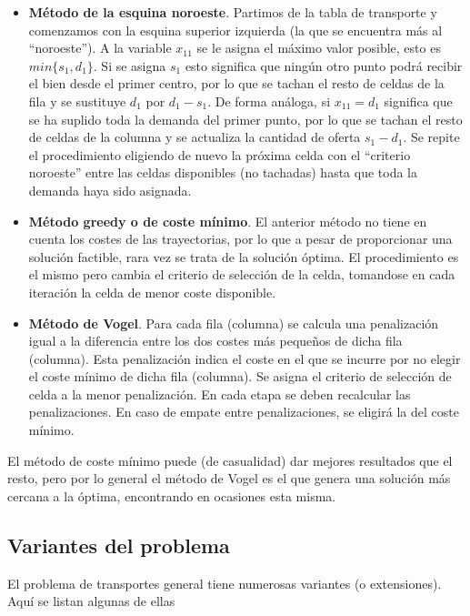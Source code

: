 \begin{itemize}
    \item \textbf{Método de la esquina noroeste}. Partimos de la tabla de transporte y comenzamos con la esquina superior
          izquierda (la que se encuentra más al ``noroeste''). A la variable $x_{11}$ se le asigna el máximo valor posible,
          esto es $min\{s_1, d_1\}$. Si se asigna $s_1$ esto significa que ningún otro punto podrá recibir el bien desde
          el primer centro, por lo que se tachan el resto de celdas de la fila y se sustituye $d_1$ por $d_1-s_1$. De
          forma análoga, si $x_{11}=d_1$ significa que se ha suplido toda la demanda del primer punto, por lo que se tachan
          el resto de celdas de la columna y se actualiza la cantidad de oferta $s_1-d_1$. Se repite el procedimiento 
          eligiendo de nuevo la próxima celda con el ``criterio noroeste'' entre las celdas disponibles (no tachadas) hasta
          que toda la demanda haya sido asignada.
    \item \textbf{Método greedy o de coste mínimo}. El anterior método no tiene en cuenta los costes de las trayectorias, por
          lo que a pesar de proporcionar una solución factible, rara vez se trata de la solución óptima. El procedimiento es
          el mismo pero cambia el criterio de selección de la celda, tomandose en cada iteración la celda de menor coste
          disponible.
    \item \textbf{Método de Vogel}. Para cada fila (columna) se calcula una penalización igual a la diferencia entre los dos 
          costes más pequeños de dicha fila (columna). Esta penalización indica el coste en el que se incurre por no elegir el 
          coste mínimo de dicha fila (columna). Se asigna el criterio de selección de celda a la menor penalización. En cada
          etapa se deben recalcular las penalizaciones. En caso de empate entre penalizaciones, se eligirá la del coste
          mínimo.
\end{itemize}

El método de coste mínimo puede (de casualidad) dar mejores resultados que el resto, pero por lo general el método de Vogel 
es el que genera una solución más cercana a la óptima, encontrando en ocasiones esta misma.

\subsection{Variantes del problema}

El problema de transportes general tiene numerosas variantes (o extensiones). Aquí se listan algunas de ellas

